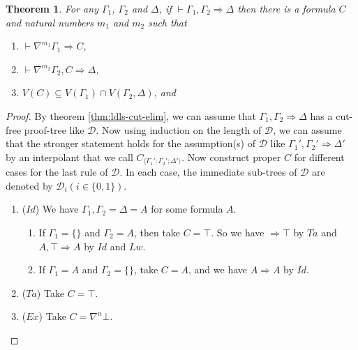 \documentclass[12pt,a4paper]{article}
\theoremstyle{plain}
\newtheorem{thm}{Theorem}[section]
\theoremstyle{definition}
\begin{document}
\begin{thm}\label{thm:ldls-dedint}
	For any $\Gamma_1$, $\Gamma_2$ and $\Delta$, if $\vdash \Gamma_1 , \Gamma_2 \Rightarrow \Delta$ then there is a formula $C$ and natural numbers $m_1$ and $m_2$ such that
	\begin{enumerate}[label=(\arabic**)]
		\item $\vdash \nabla^{m_1} \Gamma_1 \Rightarrow C$,
		\item $\vdash \nabla^{m_2} \Gamma_2 , C \Rightarrow \Delta$,
		\item $V(C) \subseteq V(\Gamma_1) \cap V(\Gamma_2,\Delta)$, and
	\end{enumerate}
\end{thm}
\begin{proof}
	By theorem \ref{thm:ldls-cut-elim}, we can assume that $\Gamma_1, \Gamma_2 \Rightarrow \Delta$ has a cut-free proof-tree like $\mathcal{D}$. Now using induction on the length of $\mathcal{D}$, we can assume that the stronger statement holds for the assumption(s) of $\mathcal{D}$ like $\Gamma_1', \Gamma_2' \Rightarrow \Delta'$ by an interpolant that we call $C_{\langle\Gamma_1';\Gamma_2';\Delta'\rangle}$.
	Now construct proper $C$ for different cases for the last rule of $\mathcal{D}$. In each case, the immediate sub-trees of $\mathcal{D}$ are denoted by $\mathcal{D}_i (i \in \{0,1\})$.
	\begin{enumerate}
		\item ($Id$) We have $\Gamma_1,\Gamma_2 = \Delta = A$ for some formula $A$.
		\begin{enumerate}
			\item If $\Gamma_1 = \{\}$ and $\Gamma_2 = A$, then take $C = \top$. So we have $\Rightarrow \top$ by $Ta$ and $A , \top \Rightarrow A$ by $Id$ and $Lw$.

			\item If $\Gamma_1 = A$ and $\Gamma_2 = \{\}$, take $C = A$, and we have $A \Rightarrow A$ by $Id$.
		\end{enumerate}
		\item ($Ta$) Take $C = \top$.

		\item ($Ex$) Take $C = \nabla^n \bot$.


\end{enumerate}
\end{proof}
\end{document}
